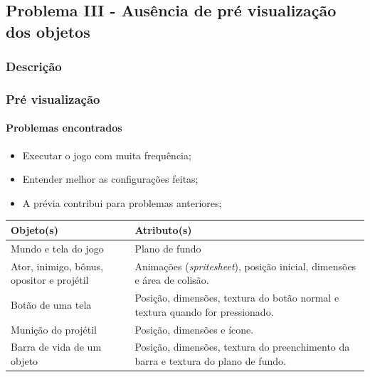 \documentclass{beamer}
\begin{document}
   \subsection{Problema III - Ausência de pré visualização dos objetos}
   \subsubsection{Descrição}
   \begin{frame}
      \frametitle{Pré visualização}
      \framesubtitle{Problemas encontrados}
         \begin{itemize}
            \item Executar o jogo com muita frequência;
            \item Entender melhor as configurações feitas;
            \item A prévia contribui para problemas anteriores;
         \end{itemize}
   \end{frame}

   \begin{frame}
      \begin{center}
         \begin{tabular}{p{12em} | p{12em}}
            \textbf{Objeto(s)} & \textbf{Atributo(s)} \\
            \hline
            Mundo e tela do jogo & Plano de fundo \\
            \hline
            Ator, inimigo, bônus, opositor e projétil & Animações (\emph{spritesheet}), posição inicial, dimensões e área de colisão. \\
            \hline
            Botão de uma tela & Posição, dimensões, textura do botão normal e textura quando for pressionado.\\
            \hline
            Munição do projétil & Posição, dimensões e ícone. \\
            \hline
            Barra de vida de um objeto & Posição, dimensões, textura do preenchimento da barra e textura do plano de fundo. \\
         \end{tabular}
      \end{center}
   \end{frame}
\end{document}
